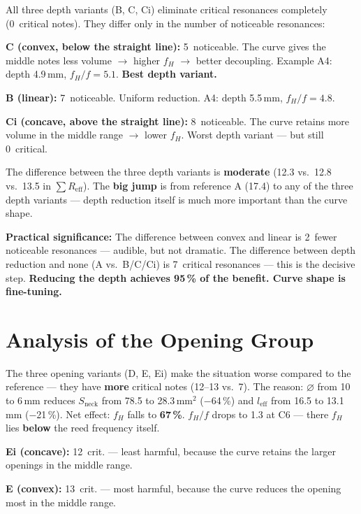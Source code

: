 \documentclass[11pt,a4paper]{article}
\begin{document}
All three depth variants (B, C, Ci) eliminate critical resonances completely (0~critical notes). They differ only in the number of noticeable resonances:

\textbf{C (convex, below the straight line):} 5~noticeable. The curve gives the middle notes less volume $\to$ higher $f_H$ $\to$ better decoupling. Example A4: depth 4.9\,mm, $f_H/f = 5{.}1$. \textbf{Best depth variant.}

\textbf{B (linear):} 7~noticeable. Uniform reduction. A4: depth 5.5\,mm, $f_H/f = 4{.}8$.

\textbf{Ci (concave, above the straight line):} 8~noticeable. The curve retains more volume in the middle range $\to$ lower $f_H$. Worst depth variant --- but still 0~critical.

The difference between the three depth variants is \textbf{moderate} (12.3 vs.\ 12.8 vs.\ 13.5 in $\sum R_\text{eff}$). The \textbf{big jump} is from reference A (17.4) to any of the three depth variants --- depth reduction itself is much more important than the curve shape.

\begin{keybox}
\textbf{Practical significance:} The difference between convex and linear is 2~fewer noticeable resonances --- audible, but not dramatic. The difference between depth reduction and none (A vs.\ B/C/Ci) is 7~critical resonances --- this is the decisive step. \textbf{Reducing the depth achieves 95\,\% of the benefit. Curve shape is fine-tuning.}
\end{keybox}

\section{Analysis of the Opening Group}

The three opening variants (D, E, Ei) make the situation worse compared to the reference --- they have \textbf{more} critical notes (12--13 vs.\ 7). The reason: $\varnothing$ from 10 to 6\,mm reduces $S_\text{neck}$ from 78.5 to 28.3\,mm$^2$ ($-$64\,\%) and $l_\text{eff}$ from 16.5 to 13.1\,mm ($-$21\,\%). Net effect: $f_H$ falls to \textbf{67\,\%}. $f_H/f$ drops to 1.3 at C6 --- there $f_H$ lies \textbf{below} the reed frequency itself.

\textbf{Ei (concave):} 12~crit. --- least harmful, because the curve retains the larger openings in the middle range.

\textbf{E (convex):} 13~crit. --- most harmful, because the curve reduces the opening most in the middle range.
\end{document}
